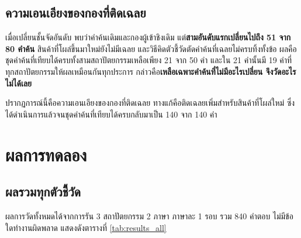 \subsection{ความเอนเอียงของกองที่ติดเฉลย}

เมื่อเปลี่ยนชั้นจัดอันดับ พบว่าคำค้นเดิมและกองผู้เข้าชิงเดิม แต่\textbf{สามอันดับแรกเปลี่ยนไปถึง 51 จาก 80 คำค้น} สินค้าที่โผล่ขึ้นมาใหม่ยังไม่มีเฉลย และวิธีคิดตัวชี้วัดตัดคำค้นที่เฉลยไม่ครบทิ้งทั้งข้อ ผลคือชุดคำค้นที่เทียบได้ครบทั้งสามสถาปัตยกรรมเหลือเพียง 21 จาก 50 คำ และใน 21 คำนั้นมี 19 คำที่ทุกสถาปัตยกรรมให้ผลเหมือนกันทุกประการ กล่าวคือ\textbf{เหลือเฉพาะคำค้นที่ไม่มีอะไรเปลี่ยน จึงวัดอะไรไม่ได้เลย}

ปรากฏการณ์นี้คือความเอนเอียงของกองที่ติดเฉลย \cite{zobel1998reliable} ทางแก้คือติดเฉลยเพิ่มสำหรับสินค้าที่โผล่ใหม่ ซึ่งได้ดำเนินการแล้วจนชุดคำค้นที่เทียบได้ครบกลับมาเป็น 140 จาก 140 คำ

\section{ผลการทดลอง}

\subsection{ผลรวมทุกตัวชี้วัด}

ผลการวัดทั้งหมดได้จากการรัน 3 สถาปัตยกรรม 2 ภาษา ภาษาละ 1 รอบ รวม 840 คำตอบ ไม่มีข้อใดทำงานผิดพลาด แสดงดังตารางที่ \ref{tab:results_all}

